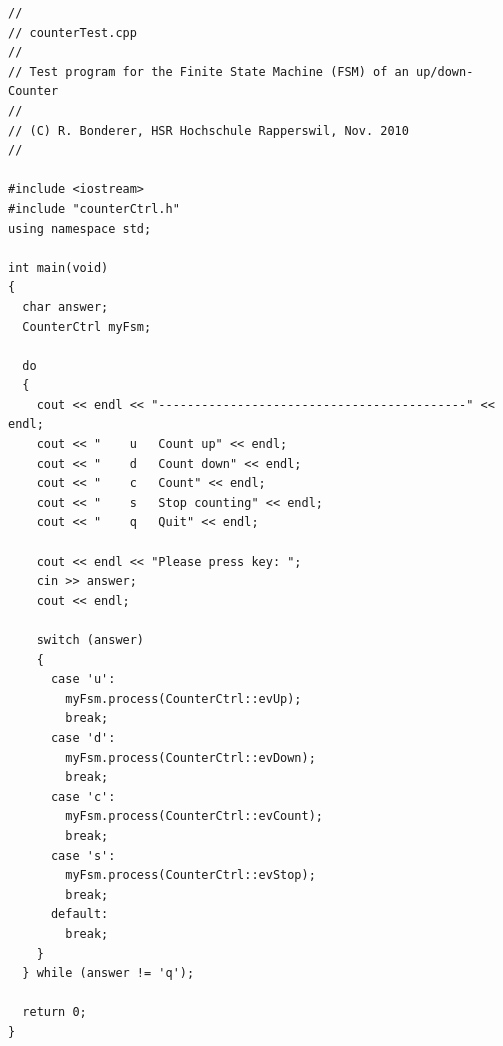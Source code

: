 \begin{lstlisting}
//
// counterTest.cpp
//
// Test program for the Finite State Machine (FSM) of an up/down-Counter
//
// (C) R. Bonderer, HSR Hochschule Rapperswil, Nov. 2010
//

#include <iostream>
#include "counterCtrl.h"
using namespace std;

int main(void)
{
  char answer;
  CounterCtrl myFsm;
  
  do
  {
    cout << endl << "-------------------------------------------" << endl;
    cout << "    u   Count up" << endl;
    cout << "    d   Count down" << endl;
    cout << "    c   Count" << endl;
    cout << "    s   Stop counting" << endl;
    cout << "    q   Quit" << endl;

    cout << endl << "Please press key: ";
    cin >> answer;
    cout << endl;
    
    switch (answer)
    {
      case 'u':
        myFsm.process(CounterCtrl::evUp);
        break;
      case 'd':
        myFsm.process(CounterCtrl::evDown);
        break;
      case 'c':
        myFsm.process(CounterCtrl::evCount);
        break;
      case 's':
        myFsm.process(CounterCtrl::evStop);
        break;
      default:
        break;
    }
  } while (answer != 'q');
  
  return 0;
}

\end{lstlisting}

